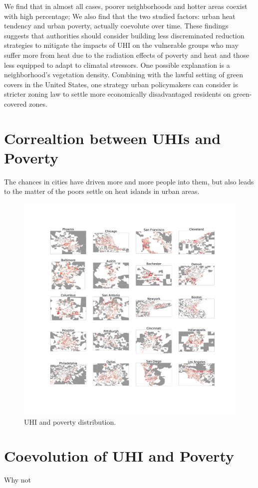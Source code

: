 We find that in almost all cases, poorer neighborhoods and hotter areas coexist with high percentage; We also find that the two studied factors: urban heat tendency and urban poverty, actually coevolute over time. These findings suggests that authorities should consider building less discreminated reduction strategies to mitigate the impacts of UHI on the vulnerable groups who may suffer more from heat due to the radiation effects of poverty and heat and those less equipped to adapt to climatal stressors. One possible explanation is a neighborhood's vegetation density. Combining with the lawful setting of green covers in the United States, one strategy urban policymakers can consider is stricter zoning law to settle more economically disadvantaged residents on green-covered zones.

\section{Correaltion between UHIs and Poverty}

The chances in cities have driven more and more people into them, but also leads to the matter of the poors settle on heat islands in urban areas.

\begin{figure}
    \centering
    \includegraphics[width = 0.999\linewidth]{Pics/UHI_combined}
    \caption{UHI and poverty distribution.}
\end{figure}

\section{Coevolution of UHI and Poverty}

Why not